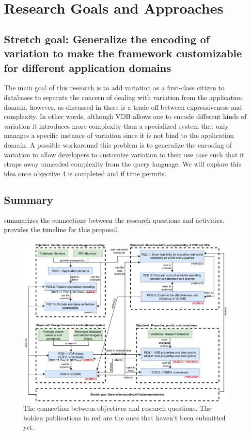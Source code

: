 \section{Research Goals and Approaches}
\label{sec:goals}







\subsection{Stretch goal: Generalize the encoding of variation to make the framework
customizable for different application domains}
\label{sec:ro5}

The main goal of this research is to add variation as a first-class citizen to 
databases to separate the concern of dealing with variation from the application
domain, however, as discussed in  there is a trade-off between 
 expressiveness and complexity. In other words, although VDB allows 
one to encode different kinds of variation it introduces more complexity than a
specialized system that only manages a specific instance of variation
since it is not bind to the application domain. 
A possible workaround this problem is to generalize the encoding of
variation to allow developers to customize variation to their use case such 
that it straps away unneeded complexity from the query language. We will 
explore this idea once objective 4 is completed and if time permits. 

\subsection{Summary}
\label{sec:sum}

 summarizes the connections between the research questions and activities.
 provides the timeline for this proposal.



\begin{figure}
\centering
\includegraphics[scale = 0.8] {figs/conn.pdf}
\caption{The connection between objectives and research questions.
The bolden publications in red are the ones that haven't been submitted yet.}
\label{fig:conn}
\end{figure}

